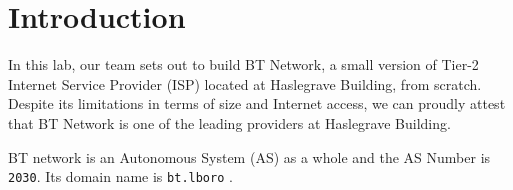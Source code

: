 \chapter{Introduction}
\label{chap:introduction}

In this lab, our team sets out to build BT Network, a small version of Tier-2 Internet Service Provider (ISP) located at Haslegrave Building, from scratch. Despite its limitations in terms of size and Internet access, we can proudly attest that BT Network is one of the leading providers at Haslegrave Building.

BT network is an Autonomous System (AS) as a whole and the AS Number is \texttt{2030}. Its domain name is \texttt{bt.lboro} .

